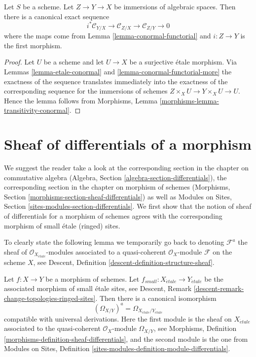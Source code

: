 \begin{lemma}
\label{lemma-transitivity-conormal}
Let $S$ be a scheme.
Let $Z \to Y \to X$ be immersions of algebraic spaces.
Then there is a canonical exact sequence
$$
i^*\mathcal{C}_{Y/X} \to
\mathcal{C}_{Z/X} \to
\mathcal{C}_{Z/Y} \to 0
$$
where the maps come from
Lemma \ref{lemma-conormal-functorial}
and $i : Z \to Y$ is the first morphism.
\end{lemma}

\begin{proof}
Let $U$ be a scheme and let $U \to X$ be a surjective \'etale morphism. Via
Lemmas \ref{lemma-etale-conormal} and \ref{lemma-conormal-functorial-more}
the exactness of the sequence translates immediately into the
exactness of the corresponding sequence for the immersions of schemes
$Z \times_X U \to Y \times_X U \to U$. Hence the lemma follows from
Morphisms, Lemma \ref{morphisms-lemma-transitivity-conormal}.
\end{proof}




\section{Sheaf of differentials of a morphism}
\label{section-sheaf-differentials}

\noindent
We suggest the reader take a look at the corresponding section
in the chapter on commutative algebra
(Algebra, Section \ref{algebra-section-differentials}),
the corresponding section in the chapter on morphism of schemes
(Morphisms, Section \ref{morphisms-section-sheaf-differentials})
as well as
Modules on Sites, Section \ref{sites-modules-section-differentials}.
We first show that the notion of sheaf of differentials for a
morphism of schemes agrees with the corresponding morphism of
small \'etale (ringed) sites.

\medskip\noindent
To clearly state the following lemma we temporarily go back to
denoting $\mathcal{F}^a$ the sheaf of $\mathcal{O}_{X_{\acute{e}tale}}$-modules
associated to a quasi-coherent $\mathcal{O}_X$-module $\mathcal{F}$
on the scheme $X$, see
Descent, Definition \ref{descent-definition-structure-sheaf}.

\begin{lemma}
\label{lemma-match-modules-differentials}
Let $f : X \to Y$ be a morphism of schemes. Let
$f_{small} : X_{\acute{e}tale} \to Y_{\acute{e}tale}$ be the associated
morphism of small \'etale sites, see
Descent, Remark \ref{descent-remark-change-topologies-ringed-sites}.
Then there is a canonical isomorphism
$$
(\Omega_{X/Y})^a = \Omega_{X_{\acute{e}tale}/Y_{\acute{e}tale}}
$$
compatible with universal derivations. Here the first module
is the sheaf on $X_{\acute{e}tale}$ associated
to the quasi-coherent $\mathcal{O}_X$-module $\Omega_{X/Y}$, see
Morphisms, Definition \ref{morphisms-definition-sheaf-differentials},
and the second module is the one from
Modules on Sites,
Definition \ref{sites-modules-definition-module-differentials}.
\end{lemma}

